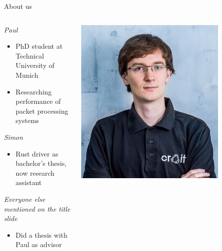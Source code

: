 \documentclass[NET,english,aspectratio=43,notitleframe]{tumbeamer}
\begin{document}
\begin{frame}{About us}
\begin{columns}
\begin{column}{0.8\textwidth}
\emph{Paul}
\begin{itemize}
\item PhD student at Technical University of Munich
\item Researching performance of packet processing systems
\end{itemize}
\vfill
\emph{Simon}
\begin{itemize}
\item Rust driver as bachelor's thesis, now research assistant
\end{itemize}
\emph{Everyone else mentioned on the title slide}
\begin{itemize}
\item Did a thesis with Paul as advisor
\end{itemize}
\end{column}
\begin{column}{0.15\textwidth}
\includegraphics[width=0.8\textwidth]{pics/paul.jpg}\\

\end{column}
\end{columns}
\end{frame}
\end{document}
